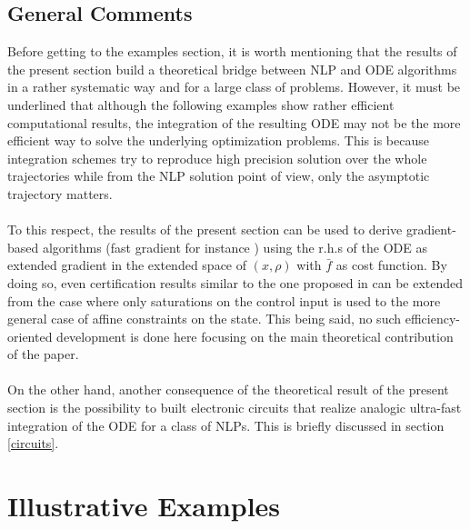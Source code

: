 \documentclass{article}
\begin{document}
\subsection{General Comments}
\noindent Before getting to the examples section, it is worth mentioning that the results of the present section build a theoretical bridge between NLP and ODE algorithms in a rather systematic way and for a large class of problems. However, it must be underlined that although the following examples show rather efficient computational results, the integration of the resulting ODE may not be the more efficient way to solve the underlying optimization problems. This is because integration schemes try to reproduce high precision solution over the whole trajectories while from the NLP solution point of view, only the asymptotic trajectory matters. \ \\ \ \\ 
To this respect, the results of the present section can be used to derive gradient-based algorithms (fast gradient for instance \cite{Nesterov1983,Nesterov:04}) using the r.h.s of the ODE as extended gradient in the extended space of $(x,\rho)$ with $\bar f$ as cost function. By doing so, even certification results similar to the one proposed in \cite{Richter:2012} can be extended from the case where only saturations on the control input is used to the more general case of affine constraints on the state. This being said, no such efficiency-oriented development is done here focusing on the main theoretical contribution of the paper. \ \\ \ \\ 
On the other hand, another consequence of the theoretical result of the present section is the possibility to built electronic circuits that realize analogic ultra-fast integration of the ODE for a class of NLPs. This is briefly discussed in section \ref{circuits}. 
\section{Illustrative Examples} \label{secexamples} 
\end{document}
